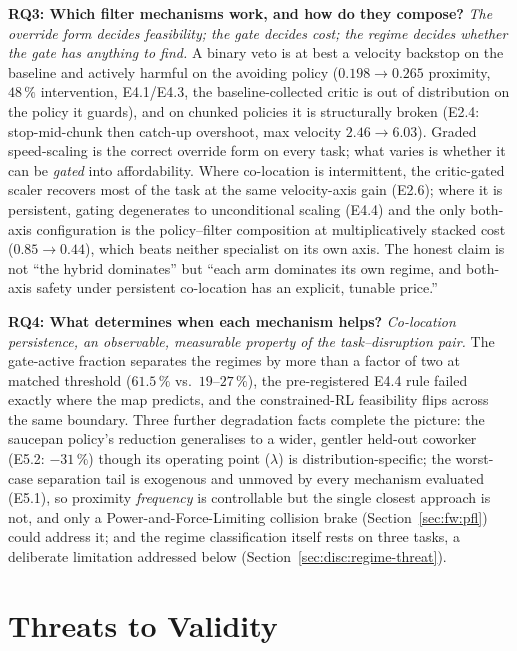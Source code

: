 \documentclass[11pt,a4paper]{report}
\begin{document}
\textbf{RQ3: Which filter mechanisms work, and how do they compose?}
\emph{The override form decides feasibility; the gate decides cost;
the regime decides whether the gate has anything to find.} A binary
veto is at best a velocity backstop on the baseline and actively
harmful on the avoiding policy ($0.198 \to 0.265$ proximity,
$48\,\%$ intervention, E4.1/E4.3, the baseline-collected critic is
out of distribution on the policy it guards), and on chunked
policies it is structurally broken (E2.4: stop-mid-chunk then
catch-up overshoot, max velocity $2.46 \to 6.03$). Graded
speed-scaling is the correct override form on every task; what
varies is whether it can be \emph{gated} into affordability. Where
co-location is intermittent, the critic-gated scaler recovers most
of the task at the same velocity-axis gain (E2.6); where it is
persistent, gating degenerates to unconditional scaling (E4.4) and
the only both-axis configuration is the policy--filter composition
at multiplicatively stacked cost ($0.85 \to 0.44$), which beats
neither specialist on its own axis. The honest claim is not ``the
hybrid dominates'' but ``each arm dominates its own regime, and
both-axis safety under persistent co-location has an explicit,
tunable price.''

\textbf{RQ4: What determines when each mechanism helps?}
\emph{Co-location persistence, an observable, measurable property of
the task--disruption pair.} The gate-active fraction separates the
regimes by more than a factor of two at matched threshold
($61.5\,\%$ vs.\ $19$--$27\,\%$), the pre-registered E4.4 rule failed
exactly where the map predicts, and the
constrained-RL feasibility flips across the same boundary. Three
further degradation facts complete the picture: the saucepan
policy's reduction generalises to a wider, gentler held-out coworker
(E5.2: $-31\,\%$) though its operating point ($\lambda$) is
distribution-specific; the worst-case separation tail is exogenous
and unmoved by every mechanism evaluated (E5.1), so proximity
\emph{frequency} is controllable but the single closest approach is
not, and only a Power-and-Force-Limiting collision brake
(Section~\ref{sec:fw:pfl}) could address it; and the regime
classification itself rests on three tasks, a deliberate limitation
addressed below (Section~\ref{sec:disc:regime-threat}).

\section{Threats to Validity}
\label{sec:disc:threats}
\end{document}
